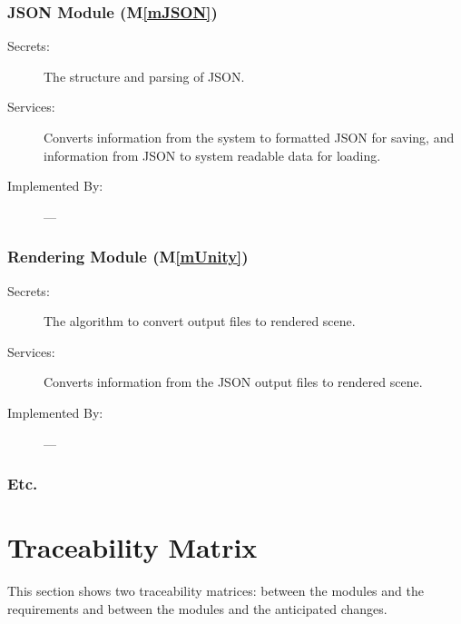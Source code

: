 \documentclass[12pt, titlepage]{article}
\newcommand{\mref}[1]{M\ref{#1}}
\begin{document}
\subsubsection{JSON Module (\mref{mJSON})}

\begin{description}
	\item[Secrets:]The structure and parsing of JSON.
	\item[Services:]Converts information from the system to formatted JSON for 
	saving, and information from JSON to system readable data for loading.
	\item[Implemented By:] ---
\end{description}

\subsubsection{Rendering Module (\mref{mUnity})}

\begin{description}
	\item[Secrets:]The algorithm to convert output files to rendered scene.
	\item[Services:]Converts information from the JSON output files to rendered 
	scene.
	\item[Implemented By:] ---
\end{description}

\subsubsection{Etc.}

\section{Traceability Matrix} \label{SecTM}

This section shows two traceability matrices: between the modules and the
requirements and between the modules and the anticipated changes.
\end{document}
